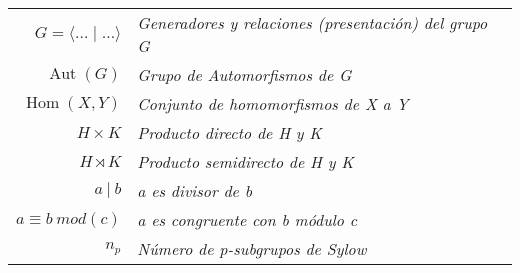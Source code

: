 \begin{table}[H]
\begin{tabular}{r|l}
$G = \langle \ldots \mid \ldots \rangle  $ & \textit{Generadores y relaciones (presentación) del grupo G} \\
$\operatorname{Aut}(G)$ & \textit{Grupo de Automorfismos de G} \\
$\operatorname{Hom}(X,Y)$ & \textit{Conjunto de homomorfismos de X a Y}\\
$H\times K$ & \textit{Producto directo de H y K} \\
$H \rtimes K$ & \textit{Producto semidirecto de H y K}\\
$a \: | \: b$ &  \textit{a es divisor de b}\\
$a\equiv b\: mod (c)$ & \textit{a es congruente con b módulo c}\\
$n_p$ & \textit{Número de p-subgrupos de Sylow}



\end{tabular}
\end{table}



\endinput
